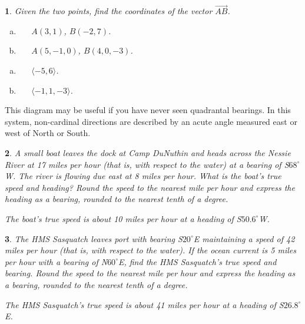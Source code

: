 \documentclass{amsbook}
\newcommand{\ssp}{\begin{enumerate}[(a), leftmargin=*]}
\newcommand{\esp}{\end{enumerate}}
\newtheorem{exc}{}
\newenvironment{ex}{\begin{exc}\normalfont}{\end{exc}}
\numberwithin{section}{chapter}
\numberwithin{equation}{chapter}
\newcommand{\dg}{{^\circ}}
\begin{document}
\begin{ex}
	Given the two points, find the coordinates of the vector $\overrightarrow{AB}$.
	\ssp
	\item \ \ \ $A(3,1)$, $B(-2,7)$.
	\item \ \ \ $A(5,-1,0)$, $B(4,0,-3)$.
	\esp
	\begin{sol}
	\ssp
	\item \ \ \ $\langle -5, 6 \rangle$.
	\item \ \ \ $\langle -1,1,-3 \rangle$.
	\esp
	\end{sol}
\end{ex}

\begin{multicols}{2}
This diagram may be useful if you have never seen quadrantal bearings. In this system, non-cardinal directions are described by an acute angle measured east or west of North or South.


\end{multicols}

\begin{ex}
	A small boat leaves the dock at Camp DuNuthin and heads across the Nessie River at 17 miles per hour (that is, with respect to the water) at a bearing of  S$68^{\circ}$W.   The river is flowing due east at 8 miles per hour.  What is the boat's true speed and heading?  Round the speed to the nearest mile per hour and express the heading as a bearing, rounded to the nearest tenth of a degree.  
	\begin{sol}
		The boat's true speed is about 10 miles per hour at a heading of S$50.6^{\circ}$W.
	\end{sol}
\end{ex}

\begin{ex}
	\label{HMSSasquatchVectorBearing} The HMS Sasquatch leaves port with bearing S$20^{\circ}$E maintaining a speed of 42 miles per hour (that is, with respect to the water).  If the ocean current is 5 miles per hour with a bearing of N$60^{\circ}$E, find the HMS Sasquatch's true speed and bearing.  Round the speed to the nearest mile per hour and express the heading as a bearing, rounded to the nearest tenth of a degree. 
	\begin{sol}
		The HMS Sasquatch's true speed is about 41 miles per hour at a heading of S$26.8^{\circ}$E.
	\end{sol}
\end{ex}
\end{document}
